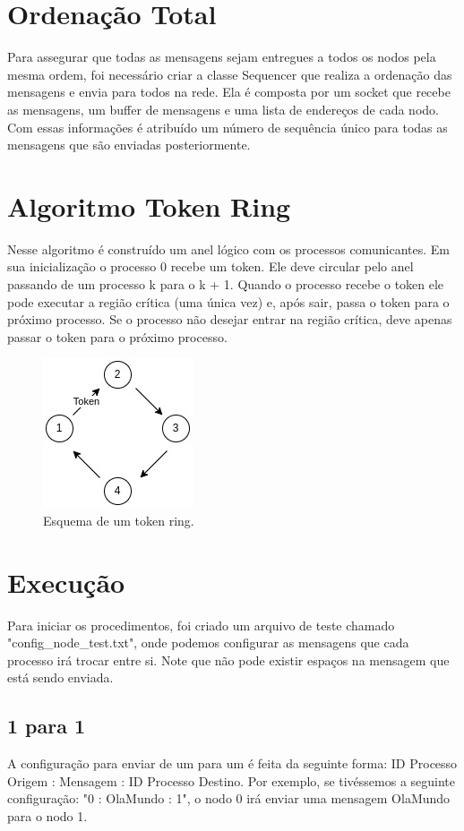 \documentclass[
	12pt,				%
	openright,			%
	oneside,			%
	a4paper,			%
	english,			%
	french,				%
	spanish,			%
	brazil				%
	]{abntex2}
\begin{document}
\section{Ordenação Total}
Para assegurar que todas as mensagens sejam entregues a todos os nodos pela mesma ordem,
foi necessário criar a classe Sequencer que realiza a ordenação das mensagens e envia
para todos na rede. Ela é composta por um socket que recebe as mensagens, um buffer de mensagens e uma lista de endereços
de cada nodo. Com essas informações é atribuído um número de sequência único para todas 
as mensagens que são enviadas posteriormente.

\section{Algoritmo Token Ring}
Nesse algoritmo é construído um anel lógico com os processos comunicantes.
Em sua inicialização o processo 0 recebe um token. Ele deve circular 
pelo anel passando de um processo k para o k + 1. Quando o processo
recebe o token ele pode executar a região crítica (uma única vez) e, após sair,
passa o token para o próximo processo. Se o processo não desejar entrar na 
região crítica, deve apenas passar o token para o próximo processo.

\begin{figure}[!h]
    \centering
    \includegraphics[scale=0.9]{token.jpg}
    \caption{Esquema de um token ring.}
    \label{fig:token}
\end{figure}

\section{Execução}
Para iniciar os procedimentos, foi criado um arquivo de teste chamado "config\_node\_test.txt",
onde podemos configurar as mensagens que cada processo irá trocar entre si.
Note que não pode existir espaços na mensagem que está sendo enviada.

\subsection{1 para 1}
A configuração para enviar de um para um é feita da seguinte forma: ID Processo Origem : Mensagem : ID Processo Destino.
Por exemplo, se tivéssemos a seguinte configuração: "0 : OlaMundo : 1", o nodo
0 irá enviar uma mensagem OlaMundo para o nodo 1. 
\end{document}
